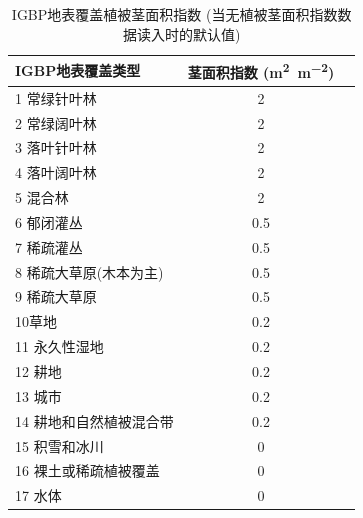 \begin{table}[htbp]
    \centering
    \caption[IGBP地表覆盖植被茎面积指数]{IGBP地表覆盖植被茎面积指数 (当无植被茎面积指数数据读入时的默认值)}
    \label{tab:IGBP地表覆盖植被茎面积指数}
\begin{tabular}{@{}lcc@{}}
\toprule
IGBP地表覆盖类型    & 茎面积指数 (\unit{m^2.m^{-2}}) \\ \midrule
1 常绿针叶林       & 2                             \\
2 常绿阔叶林       & 2                             \\
3 落叶针叶林       & 2                             \\
4 落叶阔叶林       & 2                             \\
5 混合林         & 2                           \\
6 郁闭灌丛        & 0.5                           \\
7 稀疏灌丛        & 0.5                           \\
8 稀疏大草原(木本为主) & 0.5                           \\
9 稀疏大草原       & 0.5                           \\
10草地          & 0.2                           \\
11 永久性湿地      & 0.2                           \\
12 耕地         & 0.2                           \\
13 城市         & 0.2                           \\
14 耕地和自然植被混合带 & 0.2                             \\
15 积雪和冰川      & 0                             \\
16 裸土或稀疏植被覆盖  & 0                             \\ 
17 水体          & 0                             \\ \bottomrule
\end{tabular}
\end{table}

